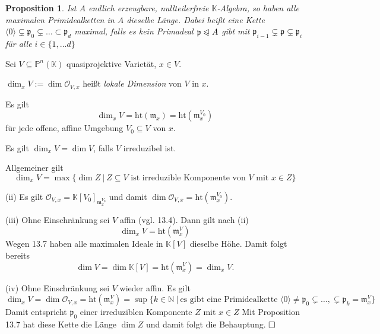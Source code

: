 \documentclass[11pt]{book}
\newtheorem{prop}[theorem]{Proposition}
\theoremstyle{nonumberbreak}
\newenvironment{pr}[1][]{\ifthenelse{\equal{#1}{}}{\proof}{\proof[#1]}\rm}{\endproof}
\newenvironment{definprop}[1][]{\ifthenelse{\equal{#1}{}}{\definiprop}{\definiprop[#1]}\rm}{\enddefiniprop}
\begin{document}
\begin{spacing}{1.3}
\begin{prop} %

Ist $A$ endlich erzeugbare, nullteilerfreie $\mathbb{K}$-Algebra, so haben alle maximalen Primidealketten in $A$ dieselbe Länge. Dabei heißt eine Kette $\langle 0 \rangle \subsetneq \mathfrak{p}_0 \subsetneq \ldots \subset \mathfrak{p}_d$ maximal, falls es kein Primadeal $\mathfrak{p} \trianglelefteqslant A$ gibt mit $\mathfrak{p}_{i-1} \subsetneq \mathfrak{p} \subsetneq \mathfrak{p}_{i}$ für alle $i \in \{1, \ldots d\}$
\end{prop}

\begin{definprop} %

Sei $V \subseteq \mathbb{P}^n(\mathbb{K})$ quasiprojektive Varietät, $x \in V$.
\begin{compactenum}
\item $\dim_x V := \dim \mathcal{O}_{V,x}$ heißt \textit{lokale Dimension} von $V$ in $x$.
\item Es gilt $$\dim_x V = \textrm{ht} (\mathfrak{m}_x) = \textrm{ht}(\mathfrak{m}_x^{V_0})$$
für jede offene, affine Umgebung $V_0 \subseteq V$ von $x$.
\item Es gilt $\dim_x V = \dim V$, falls $V$ irreduzibel ist.
\item Allgemeiner gilt
$$\dim_x V = \max \{ \dim Z \ \vert \ Z \subseteq V \textrm{ ist irreduzible Komponente von $V$ mit } x \in Z \}$$
\end{compactenum}
\begin{pr}
\begin{compactenum}
\item[(ii)] Es gilt $\mathcal{O}_{V,x} = \mathbb{K}[V_0]_{\mathfrak{m}_x^{V_0}}$ und damit
$\dim \mathcal{O}_{V,x} = \textrm{ht}( \mathfrak{m}_x^{V_0}).$
\item[(iii)] Ohne Einschränkung sei $V$ affin (vgl. 13.4). Dann gilt nach (ii)
$$\dim_x V = \textrm{ht}(\mathfrak{m}_x^V)$$
Wegen 13.7 haben alle maximalen Ideale in $\mathbb{K}[V]$ dieselbe Höhe. Damit folgt bereits
$$\dim V = \dim \mathbb{K}[V] = \textrm{ht} ( \mathfrak{m}_x^V) = \dim_x V. $$

\item[(iv)] Ohne Einschränkung sei $V$ wieder affin. Es gilt
$$\dim_xV = \dim \mathcal{O}_{V,x} = \textrm{ht} \left( \mathfrak{m}_x^V \right) = \sup \{ k \in \mathbb{N} \ \vert \ \textrm{es gibt eine Primidealkette } \langle 0 \rangle \neq \mathfrak{p_0} \subsetneq \ldots, \subsetneq \mathfrak{p}_k = \mathfrak{m}_x^V \}$$
Damit entspricht $\mathfrak{p}_0$ einer irreduziblen Komponente $Z$ mit $x \in Z$ Mit Proposition 13.7 hat diese Kette die Länge $\dim Z$ und damit folgt die Behauptung. $\hfill \Box$


\end{compactenum}
\end{pr}
\end{definprop}
\end{spacing}
\end{document}
